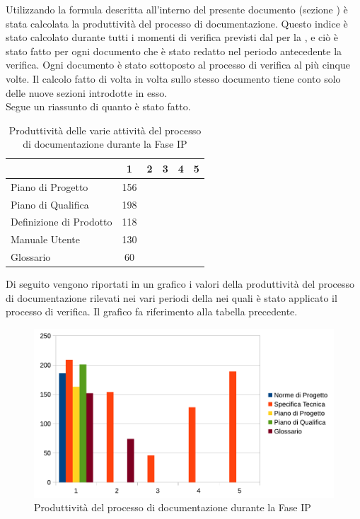 	Utilizzando la formula descritta all'interno del presente documento (sezione ) è stata calcolata la produttività del processo di documentazione. Questo indice è stato calcolato durante tutti i momenti di verifica previsti dal  per la , e ciò è stato fatto per ogni documento che è stato redatto nel periodo antecedente la verifica. Ogni documento è stato sottoposto al processo di verifica al più cinque volte. Il calcolo fatto di volta in volta sullo stesso documento tiene conto solo delle nuove sezioni introdotte in esso.\\
	Segue un riassunto di quanto è stato fatto.
	\begin{table}[H]
		  \centering
			\begin{tabu}{| l | c | c | c | c | c |}
			\hline
			&1	&2	&3	&4	&5	\\ \hline
			Piano di Progetto	& 156 &	&	&	& \\ \hline
			Piano di Qualifica	& 198	&	&	&	&\\ \hline
			Definizione di Prodotto & 118 &	 	&	&  	&\\ \hline
			Manuale Utente & 130	&	&	&	& \\ \hline
			Glossario & 60 &  & & &\\ \hline
			\end{tabu}
			\caption{Produttività delle varie attività del processo di documentazione durante la Fase IP}
	\end{table}
	Di seguito vengono riportati in un grafico i valori della produttività del processo di documentazione rilevati nei vari periodi della  nei quali è stato applicato il processo di verifica. Il grafico fa riferimento alla tabella precedente.\\
	\begin{figure}[H]
		\centering
			\includegraphics[width=12cm]{PianoDiQualifica/Pics/ProduttivitaDocumentazioneFaseSD.pdf}
		\caption{Produttività del processo di documentazione durante la Fase IP}
	\end{figure}

